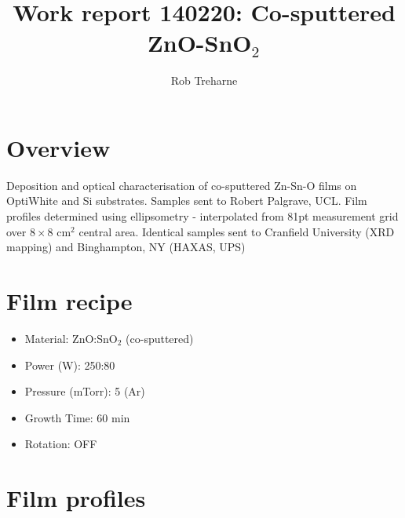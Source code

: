 \documentclass{article}
\title{Work report 140220: Co-sputtered ZnO-SnO$_2$}
\author{Rob Treharne}
\begin{document}
\maketitle

\section{Overview}

Deposition and optical characterisation of co-sputtered Zn-Sn-O films on OptiWhite and Si substrates. Samples sent to Robert Palgrave, UCL. Film profiles determined using ellipsometry - interpolated from 81pt measurement grid over $8\times8$ cm$^2$ central area. Identical samples sent to Cranfield University (XRD mapping) and Binghampton, NY (HAXAS, UPS)

\section{Film recipe}

\begin{itemize}
  \item{Material: ZnO:SnO$_2$ (co-sputtered)}
  \item{Power (W): 250:80}
  \item{Pressure (mTorr): 5 (Ar)}
  \item{Growth Time: 60 min}
  \item{Rotation: OFF}
\end{itemize}

\section{Film profiles}
\end{document}

